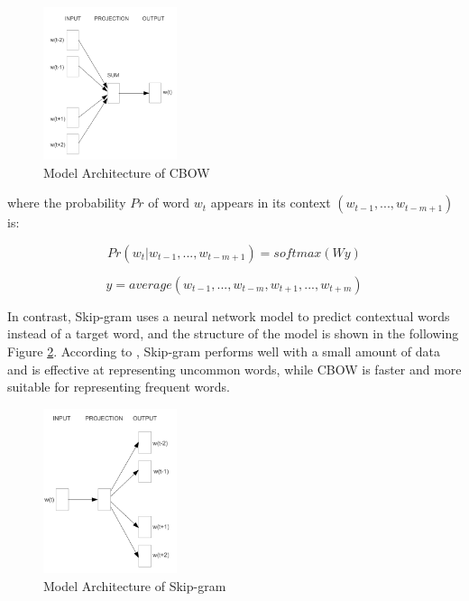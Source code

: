 \begin{figure}[H]
    \centering
    \includegraphics[width=0.35\textwidth]{images/CBOW.png}
    \caption{Model Architecture of CBOW \cite{mikolov2013efficient}}
    \label{fig:8}
\end{figure}

where the probability $Pr$ of word $w_t$ appears in its context $(w_{t-1},...,w_{t-m+1})$ is:

\begin{equation}
    Pr(w_t|w_{t-1},...,w_{t-m+1}) = softmax(Wy)
\end{equation}

\begin{equation}
    y = average(w_{t-1},...,w_{t-m},w_{t+1},...,w_{t+m})
\end{equation}

In contrast, Skip-gram uses a neural network model to predict contextual words instead of a target word, and the structure of the model is shown in the following Figure \ref{fig:9}. According to \cite{mikolov2013efficient}, Skip-gram performs well with a small amount of data and is effective at representing uncommon words, while CBOW is faster and more suitable for representing frequent words.

 \begin{figure}[H]
    \centering
    \includegraphics[width=0.35\textwidth]{images/skip_gram.png}
    \caption{Model Architecture of Skip-gram \cite{mikolov2013efficient}}
    \label{fig:9}
\end{figure}

